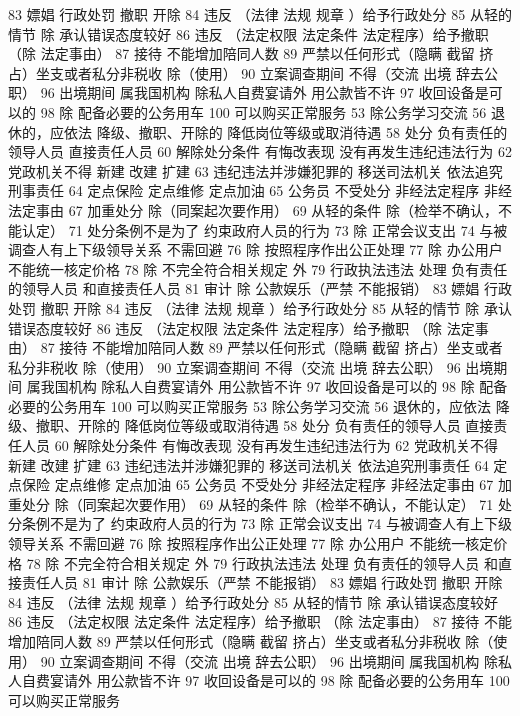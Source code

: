 \documentclass[11pt]{ctexart}
\begin{document}
83 嫖娼 行政处罚
撤职 开除
84 违反 （法律 法规 规章 ）给予行政处分
85 从轻的情节
除 承认错误态度较好
86 违反 （法定权限 法定条件 法定程序）给予撤职
（除 法定事由）
87 接待 不能增加陪同人数
89 严禁以任何形式（隐瞒 截留 挤占）坐支或者私分非税收
除（使用）
90 立案调查期间 不得（交流 出境 辞去公职）
96 出境期间 属我国机构 除私人自费宴请外 用公款皆不许
97 收回设备是可以的
98 除 配备必要的公务用车
100 可以购买正常服务
53 除公务学习交流
56 退休的，应依法
降级、撤职、开除的 降低岗位等级或取消待遇
58 处分
负有责任的领导人员
直接责任人员
60 解除处分条件
有悔改表现
没有再发生违纪违法行为
62 党政机关不得
新建 改建 扩建
63 违纪违法并涉嫌犯罪的
移送司法机关
依法追究刑事责任
64 定点保险 定点维修 定点加油
65 公务员 不受处分
非经法定程序
非经法定事由
67 加重处分
除（同案起次要作用）
69 从轻的条件
除（检举不确认，不能认定）
71 处分条例不是为了
约束政府人员的行为
73 除 正常会议支出
74 与被调查人有上下级领导关系 不需回避
76 除 按照程序作出公正处理
77 除 办公用户
不能统一核定价格
78 除 不完全符合相关规定 外
79 行政执法违法 处理
负有责任的领导人员
和直接责任人员
81 审计
除 公款娱乐（严禁 不能报销）
83 嫖娼 行政处罚
撤职 开除
84 违反 （法律 法规 规章 ）给予行政处分
85 从轻的情节
除 承认错误态度较好
86 违反 （法定权限 法定条件 法定程序）给予撤职
（除 法定事由）
87 接待 不能增加陪同人数
89 严禁以任何形式（隐瞒 截留 挤占）坐支或者私分非税收
除（使用）
90 立案调查期间 不得（交流 出境 辞去公职）
96 出境期间 属我国机构 除私人自费宴请外 用公款皆不许
97 收回设备是可以的
98 除 配备必要的公务用车
100 可以购买正常服务
53 除公务学习交流
56 退休的，应依法
降级、撤职、开除的 降低岗位等级或取消待遇
58 处分
负有责任的领导人员
直接责任人员
60 解除处分条件
有悔改表现
没有再发生违纪违法行为
62 党政机关不得
新建 改建 扩建
63 违纪违法并涉嫌犯罪的
移送司法机关
依法追究刑事责任
64 定点保险 定点维修 定点加油
65 公务员 不受处分
非经法定程序
非经法定事由
67 加重处分
除（同案起次要作用）
69 从轻的条件
除（检举不确认，不能认定）
71 处分条例不是为了
约束政府人员的行为
73 除 正常会议支出
74 与被调查人有上下级领导关系 不需回避
76 除 按照程序作出公正处理
77 除 办公用户
不能统一核定价格
78 除 不完全符合相关规定 外
79 行政执法违法 处理
负有责任的领导人员
和直接责任人员
81 审计
除 公款娱乐（严禁 不能报销）
83 嫖娼 行政处罚
撤职 开除
84 违反 （法律 法规 规章 ）给予行政处分
85 从轻的情节
除 承认错误态度较好
86 违反 （法定权限 法定条件 法定程序）给予撤职
（除 法定事由）
87 接待 不能增加陪同人数
89 严禁以任何形式（隐瞒 截留 挤占）坐支或者私分非税收
除（使用）
90 立案调查期间 不得（交流 出境 辞去公职）
96 出境期间 属我国机构 除私人自费宴请外 用公款皆不许
97 收回设备是可以的
98 除 配备必要的公务用车
100 可以购买正常服务
\end{document}
